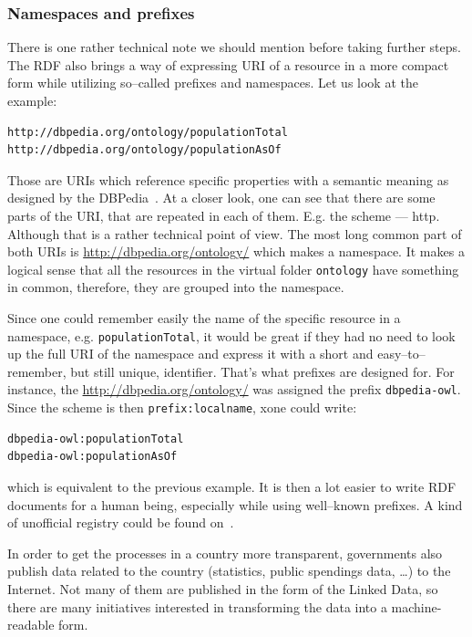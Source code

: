 \subsubsection{Namespaces and prefixes}

There is one rather technical note we should mention before taking further steps. The RDF
also brings a way of expressing URI of a resource in a more compact form while utilizing
so--called prefixes and namespaces. Let us look at the example:

\scriptsize\begin{verbatim}
http://dbpedia.org/ontology/populationTotal
http://dbpedia.org/ontology/populationAsOf
\end{verbatim}\normalsize

Those are URIs which reference specific properties with a semantic meaning as designed
by the DBPedia~\cite{dbpedia}. At a closer look, one can see that there are some parts of the URI,
that are repeated in each of them. E.g. the scheme --- http. Although that is a rather technical
point of view. The most long common part of both URIs is \url{http://dbpedia.org/ontology/}
which makes a namespace. It makes a logical sense that all the resources in the virtual
folder \texttt{ontology} have something in common, therefore, they are grouped into the namespace.

Since one could remember easily the name of the specific resource in a namespace,
e.g. \texttt{populationTotal}, it would be great if they had no need to look up the full
URI of the namespace and express it with a short and easy--to--remember, but still 
unique, identifier. That’s what prefixes are designed for. For instance, the
\url{http://dbpedia.org/ontology/} was assigned the prefix \texttt{dbpedia-owl}. Since the scheme
is then \texttt{prefix:localname}, xone could write:

\scriptsize\begin{verbatim}
dbpedia-owl:populationTotal
dbpedia-owl:populationAsOf
\end{verbatim}\normalsize

which is equivalent to the previous example. It is then a lot easier to write RDF
documents for a human being, especially while using well--known prefixes. A kind of unofficial
registry could be found on~\cite{prefixcc}.

In order to get the processes in a country more transparent, governments also publish data
related to the country (statistics, public spendings data, …) to the Internet. Not many of
them are published in the form of the Linked Data, so there are many initiatives
interested in transforming the data into a machine-readable form.

